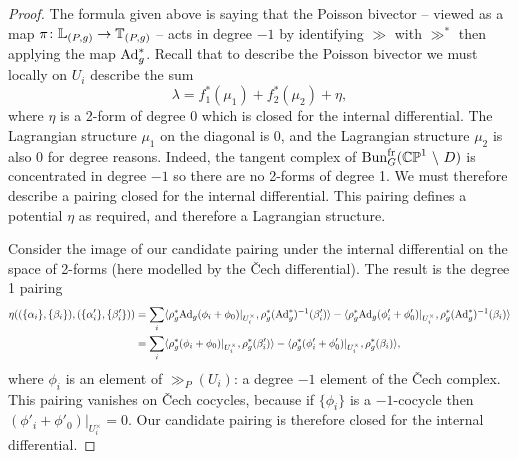 \documentclass[10pt, oneside]{article}
\newcommand{\fr}{\mathrm{fr}}
\newcommand{\Ad}{\mr{Ad}}
\begin{document}
\begin{proof}
The formula given above is saying that the Poisson bivector -- viewed as a map $\pi \colon \mathbb{L}_{(P,g)} \to \mathbb{T}_{(P,g)}$ -- acts in degree $-1$ by identifying $\gg$ with $\gg^*$ then applying the map $\Ad_g^*$.  Recall that to describe the Poisson bivector we must locally on $U_i$ describe the sum
\[\lambda = f_1^*(\mu_1) + f_2^*(\mu_2) + \eta,\] 
where $\eta$ is a 2-form of degree 0 which is closed for the internal differential. The Lagrangian structure $\mu_1$ on the diagonal is 0, and the Lagrangian structure $\mu_2$ is also 0 for degree reasons.  Indeed, the tangent complex of $\bun_G^\fr(\bb{CP}^1 \bs D)$ is concentrated in degree $-1$ so there are no 2-forms of degree 1.  We must therefore describe a pairing closed for the internal differential.  This pairing defines a potential $\eta$ as required, and therefore a Lagrangian structure.

Consider the image of our candidate pairing under the internal differential on the space of 2-forms (here modelled by the \v Cech differential).  The result is the degree 1 pairing
\begin{align*}
\eta((\{\alpha_i\}, \{\beta_i\}), (\{\alpha'_i\},\{\beta_i'\})) &= \sum_i \langle \rho_g^* \Ad_g(\phi_i + \phi_0)|_{U^\times_i}, \rho_g^*(\Ad_g^*)^{-1}(\beta'_i) \rangle - \langle \rho_g^*\Ad_g(\phi'_i + \phi'_0)|_{U^\times_i}, \rho_g^*(\Ad_g^*)^{-1}(\beta_i) \rangle\\
&= \sum_i \langle \rho_g^*(\phi_i + \phi_0)|_{U^\times_i}, \rho_g^*(\beta'_i) \rangle - \langle \rho_g^*(\phi'_i + \phi'_0)|_{U^\times_i}, \rho_g^*(\beta_i) \rangle,
\end{align*}
where $\phi_i$ is an element of $\gg_P(U_i)$: a degree $-1$ element of the \v Cech complex.  This pairing vanishes on \v Cech cocycles, because if $\{\phi_i\}$ is a $-1$-cocycle then $(\phi'_i + \phi'_0)|_{U^\times_i}=0$.  Our candidate pairing is therefore closed for the internal differential.
\end{proof}
\end{document}
